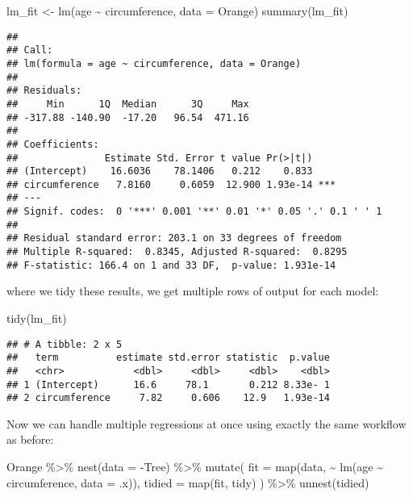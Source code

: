 \documentclass[
]{book}
\newenvironment{Shaded}{\begin{snugshade}}{\end{snugshade}}
\newcommand{\AttributeTok}[1]{\textcolor[rgb]{0.77,0.63,0.00}{#1}}
\newcommand{\FunctionTok}[1]{\textcolor[rgb]{0.00,0.00,0.00}{#1}}
\newcommand{\NormalTok}[1]{#1}
\newcommand{\OtherTok}[1]{\textcolor[rgb]{0.56,0.35,0.01}{#1}}
\newcommand{\SpecialCharTok}[1]{\textcolor[rgb]{0.00,0.00,0.00}{#1}}
\begin{document}
\begin{Shaded}
\begin{Highlighting}[]
\NormalTok{lm\_fit }\OtherTok{\textless{}{-}} \FunctionTok{lm}\NormalTok{(age }\SpecialCharTok{\textasciitilde{}}\NormalTok{ circumference, }\AttributeTok{data =}\NormalTok{ Orange)}
\FunctionTok{summary}\NormalTok{(lm\_fit)}
\end{Highlighting}
\end{Shaded}

\begin{verbatim}
## 
## Call:
## lm(formula = age ~ circumference, data = Orange)
## 
## Residuals:
##     Min      1Q  Median      3Q     Max 
## -317.88 -140.90  -17.20   96.54  471.16 
## 
## Coefficients:
##               Estimate Std. Error t value Pr(>|t|)    
## (Intercept)    16.6036    78.1406   0.212    0.833    
## circumference   7.8160     0.6059  12.900 1.93e-14 ***
## ---
## Signif. codes:  0 '***' 0.001 '**' 0.01 '*' 0.05 '.' 0.1 ' ' 1
## 
## Residual standard error: 203.1 on 33 degrees of freedom
## Multiple R-squared:  0.8345, Adjusted R-squared:  0.8295 
## F-statistic: 166.4 on 1 and 33 DF,  p-value: 1.931e-14
\end{verbatim}

where we tidy these results, we get multiple rows of output for each model:

\begin{Shaded}
\begin{Highlighting}[]
\FunctionTok{tidy}\NormalTok{(lm\_fit)}
\end{Highlighting}
\end{Shaded}

\begin{verbatim}
## # A tibble: 2 x 5
##   term          estimate std.error statistic  p.value
##   <chr>            <dbl>     <dbl>     <dbl>    <dbl>
## 1 (Intercept)      16.6     78.1       0.212 8.33e- 1
## 2 circumference     7.82     0.606    12.9   1.93e-14
\end{verbatim}

Now we can handle multiple regressions at once using exactly the same workflow as before:

\begin{Shaded}
\begin{Highlighting}[]
\NormalTok{Orange }\SpecialCharTok{\%\textgreater{}\%}
  \FunctionTok{nest}\NormalTok{(}\AttributeTok{data =} \SpecialCharTok{{-}}\NormalTok{Tree) }\SpecialCharTok{\%\textgreater{}\%}
  \FunctionTok{mutate}\NormalTok{(}
    \AttributeTok{fit =} \FunctionTok{map}\NormalTok{(data, }\SpecialCharTok{\textasciitilde{}} \FunctionTok{lm}\NormalTok{(age }\SpecialCharTok{\textasciitilde{}}\NormalTok{ circumference, }\AttributeTok{data =}\NormalTok{ .x)),}
    \AttributeTok{tidied =} \FunctionTok{map}\NormalTok{(fit, tidy)}
\NormalTok{  ) }\SpecialCharTok{\%\textgreater{}\%}
  \FunctionTok{unnest}\NormalTok{(tidied)}
\end{Highlighting}
\end{Shaded}
\end{document}
